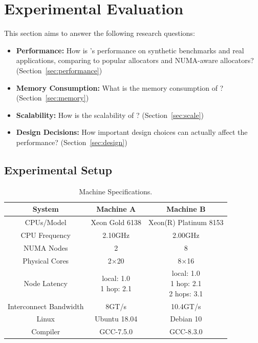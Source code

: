 \section{Experimental Evaluation}

This section aims to answer the following research questions: 

\begin{itemize}
\item \textbf{Performance:} How is \NM{}'s performance on synthetic benchmarks and real applications, comparing to popular allocators and NUMA-aware allocators? (Section~\ref{sec:performance}) 
\item \textbf{Memory Consumption:} What is the memory consumption of \NM{}? (Section~\ref{sec:memory})
\item \textbf{Scalability:} How is the scalability of \NM{}? (Section~\ref{sec:scale})
\item \textbf{Design Decisions:} How important design choices can actually affect the performance? (Section~\ref{sec:design})	
\end{itemize}

\subsection{Experimental Setup}

\begin{table}[h]
  \footnotesize
  \setlength{\tabcolsep}{1.0em}
\begin{tabular}{c c c}
\hline
System & \textbf{Machine A} & \textbf{Machine B} \\ \hline
CPUs/Model & Xeon Gold 6138	& Xeon(R) Platinum 8153\\ \hline
CPU Frequency & 2.10GHz & 2.00GHz\\ \hline
NUMA Nodes & 2 & 8 \\ \hline
Physical Cores & 2$\times$20 & 8$\times$16 \\ \hline
Node Latency & \specialcell{local: 1.0 \\ 1 hop: 2.1} & \specialcell{local: 1.0 \\ 1 hop: 2.1 \\ 2 hops: 3.1}\\ \hline
Interconnect Bandwidth & 8GT/s & 10.4GT/s\\ \hline
Linux & Ubuntu 18.04 & Debian 10\\ \hline
Compiler & GCC-7.5.0 & GCC-8.3.0 \\ \hline
  \end{tabular}
  \centering
  \caption{Machine Specifications.\label{table:Machine}}
\end{table}

